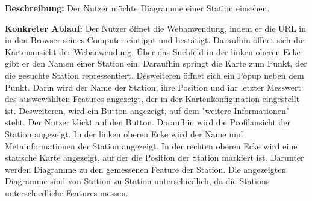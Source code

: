 \textbf{Beschreibung:} Der Nutzer möchte Diagramme einer \gls{Station} einsehen.

\textbf{Konkreter Ablauf:} Der Nutzer öffnet die \gls{Webanwendung}, indem er die URL in in den Browser seines Computer eintippt und bestätigt. Daraufhin öffnet sich die Kartenansicht der \gls{Webanwendung}. Über das Suchfeld in der linken oberen Ecke gibt er den Namen einer \gls{Station} ein. Daraufhin springt die Karte zum Punkt, der die gesuchte \gls{Station} repressentiert. Desweiteren öffnet sich ein Popup neben dem Punkt. Darin wird der Name der \gls{Station}, ihre Position und ihr letzter \gls{Messwert} des auswewählten Features angezeigt, der in der Kartenkonfiguration eingestellt ist. Desweiteren, wird ein Button angezeigt, auf dem "weitere Informationen" steht. Der Nutzer klickt auf den Button.
Daraufhin wird die Profilansicht der \gls{Station} angezeigt. In der linken oberen Ecke wird der Name und Metainformationen der \gls{Station} angezeigt. In der rechten oberen Ecke wird eine statische Karte angezeigt, auf der die Position der \gls{Station} markiert ist.
Darunter werden Diagramme zu den gemessenen Feature der \gls{Station}. Die angezeigten Diagramme sind von \gls{Station} zu \gls{Station} unterschiedlich, da die \glspl{Station} unterschiedliche Features messen.